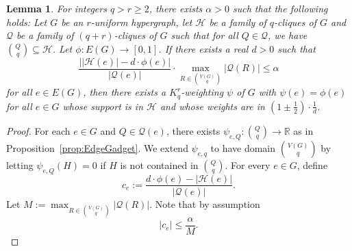 \documentclass[11pt]{article}
\numberwithin{equation}{section}
\newcommand{\mc}[1]{\mathcal{#1}}
\newcounter{i}
\theoremstyle{plain}
\newtheorem{lem}[thm]{Lemma}
\theoremstyle{plain} %
\theoremstyle{definition}
\begin{document}
\begin{lem}\label{lem:GeneralBoostLemma}
For integers $q > r \ge 2$, there exists $\alpha > 0$ such that the following holds: Let $G$ be an $r$-uniform hypergraph, let $\mathcal{H}$ be a family of $q$-cliques of $G$ and $\mathcal{Q}$ be a family of $(q+r)$-cliques of $G$ such that for all $Q\in \mc{Q}$, we have $\binom{Q}{q} \subseteq \mc{H}$. Let $\phi:E(G)\rightarrow [0,1]$. If there exists a real $d > 0$ such that 
$$\frac{\bigg| |\mc{H}(e)|-d\cdot \phi(e) \bigg|}{|\mathcal{Q}(e)|} \cdot \max_{R\in \binom{V(G)}{q}} |\mathcal{Q}(R)| \le \alpha$$
for all $e \in E(G)$, then there exists a $K_q^r$-weighting $\psi$ of $G$ with $\psi(e)=\phi(e)$ for all $e\in G$ whose support is in $\mc{H}$ and whose weights are in $\left(1\pm \frac{1}{2}\right) \cdot \frac{1}{d}$.
\end{lem}
\begin{proof}
For each $e\in G$ and $Q\in \mc{Q}(e)$, there exists $\psi_{e,Q}:\binom{Q}{q}\rightarrow \mathbb{R}$ as in Proposition~\ref{prop:EdgeGadget}. 
We extend $\psi_{e,q}$ to have domain $\binom{V(G)}{q}$ by letting $\psi_{e,Q}(H) = 0$ if $H$ is not contained in $\binom{Q}{q}$.
For every $e\in G$, define
$$c_e:= \frac{d\cdot \phi(e)-|\mc{H}(e)|}{|\mc{Q}(e)|}.$$
Let $M:= \max_{R\in \binom{V(G)}{q}} |\mathcal{Q}(R)|$. Note that by assumption
$$|c_e| \le \frac{\alpha}{M}.$$


\end{proof}
\end{document}
